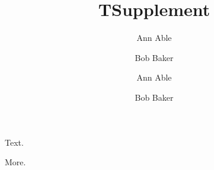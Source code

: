 \documentclass{revtex4-2}
\begin{document}
\begingroup
\title{T}
\author{Ann Able}
\author{Bob Baker}
\maketitle
Text.
\endgroup
\title{Supplement}
\author{Ann Able}
\author{Bob Baker}
\maketitle
More.
\end{document}
